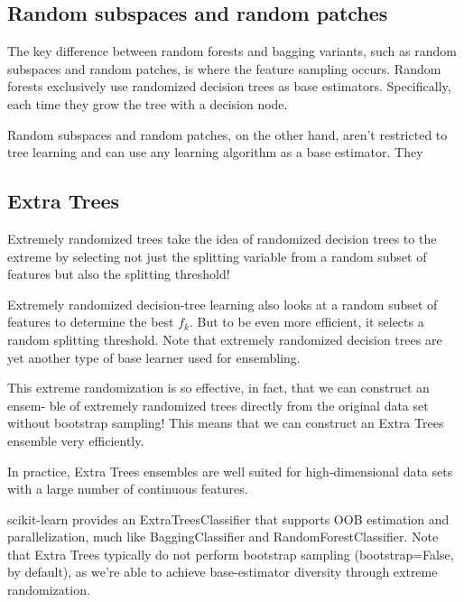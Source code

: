 \subsection{Random subspaces and random patches}

The key difference between random forests and bagging variants, such as random subspaces and random patches, is where the feature sampling occurs. Random forests
exclusively use randomized decision trees as base estimators. Specifically,  each time they grow the tree
with a decision node.

Random subspaces and random patches, on the other hand, aren’t restricted to tree
learning and can use any learning algorithm as a base estimator. They 
\subsection{Extra Trees}
Extremely randomized trees take the idea of randomized decision trees to the
extreme by selecting not just the splitting variable from a random subset of features but also the splitting threshold!

Extremely randomized decision-tree learning also looks at a random subset of features to determine the best $f_k$. But to be even more efficient, it selects a random splitting threshold. Note that extremely randomized decision trees are yet another type of
base learner used for ensembling.

This extreme randomization is so effective, in fact, that we can construct an ensem-
ble of extremely randomized trees directly from the original data set without bootstrap
sampling! This means that we can construct an Extra Trees ensemble very efficiently.

\begin{tcolorbox}[title=TIP]
    In practice, Extra Trees ensembles are well suited for high-dimensional
    data sets with a large number of continuous features.
\end{tcolorbox}

scikit-learn provides an ExtraTreesClassifier that supports OOB estimation and
parallelization, much like BaggingClassifier and RandomForestClassifier.
Note that Extra Trees typically do not perform bootstrap sampling (bootstrap=False, by default), as we’re able to achieve base-estimator diversity through
extreme randomization.

